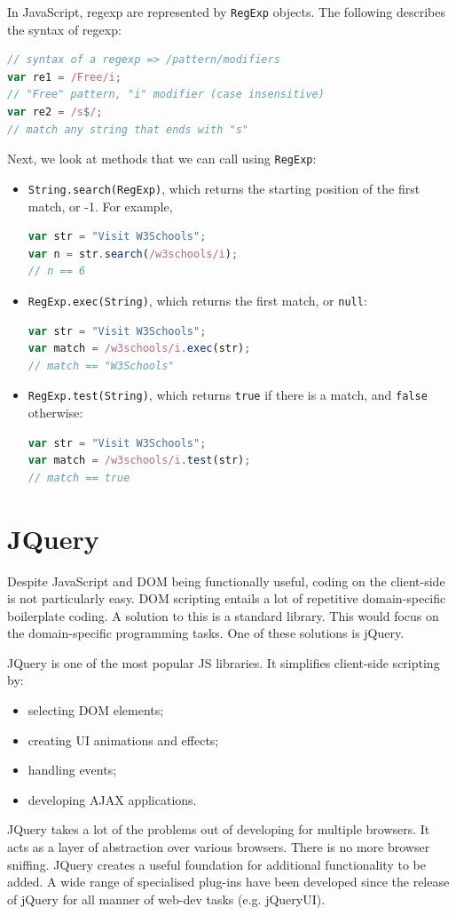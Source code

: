 \documentclass[a4paper, openany]{memoir}
\begin{document}
\noindent In JavaScript, regexp are represented by \texttt{RegExp} objects. The following describes the syntax of regexp:
\begin{lstlisting}[language=javascript]
// syntax of a regexp => /pattern/modifiers
var re1 = /Free/i;
// "Free" pattern, "i" modifier (case insensitive)
var re2 = /s$/;
// match any string that ends with "s"
\end{lstlisting}
Next, we look at methods that we can call using \texttt{RegExp}:
\begin{itemize}
    \item \texttt{String.search(RegExp)}, which returns the starting position of the first match, or -1. For example,
    \begin{lstlisting}[language=javascript]
var str = "Visit W3Schools";
var n = str.search(/w3schools/i);
// n == 6\end{lstlisting}
    
    \item \texttt{RegExp.exec(String)}, which returns the first match, or \texttt{null}:
    \begin{lstlisting}[language=javascript]
var str = "Visit W3Schools";
var match = /w3schools/i.exec(str);
// match == "W3Schools"\end{lstlisting}

    \item \texttt{RegExp.test(String)}, which returns \texttt{true} if there is a match, and \texttt{false} otherwise:
    \begin{lstlisting}[language=javascript]
var str = "Visit W3Schools";
var match = /w3schools/i.test(str);
// match == true\end{lstlisting}
\end{itemize}
\newpage

\section{JQuery}
Despite JavaScript and DOM being functionally useful, coding on the client-side is not particularly easy. DOM scripting entails a lot of repetitive domain-specific boilerplate coding. A solution to this is a standard library. This would focus on the domain-specific programming tasks. One of these solutions is jQuery.

\noindent JQuery is one of the most popular JS libraries. It simplifies client-side scripting by:
\begin{itemize}
    \item selecting DOM elements;
    \item creating UI animations and effects;
    \item handling events;
    \item developing AJAX applications.
\end{itemize}
JQuery takes a lot of the problems out of developing for multiple browsers. It acts as a layer of abstraction over various browsers. There is no more browser sniffing. JQuery creates a useful foundation for additional functionality to be added. A wide range of specialised plug-ins have been developed since the release of jQuery for all manner of web-dev tasks (e.g. jQueryUI).
\end{document}
